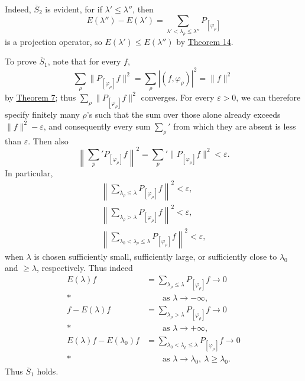\documentclass[fontsize=13pt,twoside,openany,headings=normal,parskip=false,bookmarkpackage=false,DIV=calc]{scrbook}
\begin{document}
Indeed, $\hyperref[cond:II.Sbar2]{\overline{S}_2}$ is evident, for if $\lambda'\leq\lambda''$, then
\[
E(\lambda'')-E(\lambda')=\sum_{\lambda'<\lambda_\rho\leq\lambda''}P_{[\varphi_\rho]}
\]
is a projection operator, so $E(\lambda')\leq E(\lambda'')$ by \hyperref[thm:II.14]{Theorem 14}.

\hypertarget{origpage-66}{}%
To prove $\hyperref[cond:II.Sbar1]{\overline{S}_1}$, note that for every $f$,
\[
\sum_\rho\|P_{[\varphi_\rho]}f\|^2=\sum_\rho|(f,\varphi_\rho)|^2=\|f\|^2\,
\]
by \hyperref[thm:II.7]{Theorem 7}; thus $\sum_\rho\|P_{[\varphi_\rho]}f\|^2$ converges. For every $\varepsilon>0$, we can therefore specify finitely many $\rho$'s such that the sum over those alone already exceeds $\|f\|^2-\varepsilon$, and consequently every sum $\sum_\rho'$ from which they are absent is less than $\varepsilon$. Then also
\[
\left\|\sum_p'P_{[\varphi_\rho]}f\right\|^2=\sum_p'\|P_{[\varphi_\rho]}f\|^2<\varepsilon.
\]
In particular,
\begin{gather*}
\left\|\sum_{\lambda_\rho\leq\lambda}P_{[\varphi_\rho]}f\right\|^2<\varepsilon,\\
\left\|\sum_{\lambda_\rho>\lambda}P_{[\varphi_\rho]}f\right\|^2<\varepsilon,\\
\left\|\sum_{\lambda_0<\lambda_\rho\leq\lambda}P_{[\varphi_\rho]}f\right\|^2<\varepsilon,
\end{gather*}
when $\lambda$ is chosen sufficiently small, sufficiently large, or sufficiently close to $\lambda_0$ and $\geq\lambda$, respectively. Thus indeed
\begin{align*}
E(\lambda)f&=\sum_{\lambda_\rho\leq\lambda}P_{[\varphi_\rho]}f\longrightarrow0\\*
&\qquad \text{as }\lambda\to-\infty,\\
f-E(\lambda)f&=\sum_{\lambda_\rho>\lambda}P_{[\varphi_\rho]}f\longrightarrow0\\*
&\qquad \text{as }\lambda\to+\infty,\\
E(\lambda)f-E(\lambda_0)f&=\sum_{\lambda_0<\lambda_\rho\leq\lambda}P_{[\varphi_\rho]}f\longrightarrow0\\*
&\qquad \text{as }\lambda\to\lambda_0,\ \lambda\geq\lambda_0.
\end{align*}
Thus $\hyperref[cond:II.Sbar1]{\overline{S}_1}$ holds.
\end{document}

